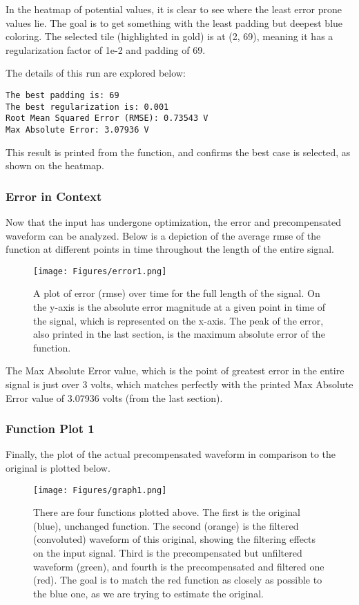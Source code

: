 In the heatmap of potential values, it is clear to see where the least error prone values lie. The goal is to get something with the least padding but deepest blue coloring. The selected tile (highlighted in gold) is at (2, 69), meaning it has a regularization factor of 1e-2 and padding of 69.

The details of this run are explored below:

\begin{verbatim}
The best padding is: 69
The best regularization is: 0.001
Root Mean Squared Error (RMSE): 0.73543 V
Max Absolute Error: 3.07936 V
\end{verbatim}

This result is printed from the function, and confirms the best case is selected, as shown on the heatmap.
\newpage
\subsubsection{Error in Context}
Now that the input has undergone optimization, the error and precompensated waveform can be analyzed. Below is a depiction of the average rmse of the function at different points in time throughout the length of the entire signal.

\begin{figure}[h!]
    \centering
\texttt{[image: Figures/error1.png]}
    \caption{A plot of error (rmse) over time for the full length of the signal. On the y-axis is the absolute error magnitude at a given point in time of the signal, which is represented on the x-axis. The peak of the error, also printed in the last section, is the maximum absolute error of the function.}
\end{figure} \label{error1}

The Max Absolute Error value, which is the point of greatest error in the entire signal is just over 3 volts, which matches perfectly with the printed Max Absolute Error value of 3.07936 volts (from the last section).
\newpage
\subsubsection{Function Plot 1}
Finally, the plot of the actual precompensated waveform in comparison to the original is plotted below.

\begin{figure}[h!]
    \centering
\texttt{[image: Figures/graph1.png]}
    \caption{There are four functions plotted above. The first is the original (blue), unchanged function. The second (orange) is the filtered (convoluted) waveform of this original, showing the filtering effects on the input signal. Third is the precompensated but unfiltered waveform (green), and fourth is the precompensated and filtered one (red). The goal is to match the red function as closely as possible to the blue one, as we are trying to estimate the original.}
\end{figure} \label{graph1}

